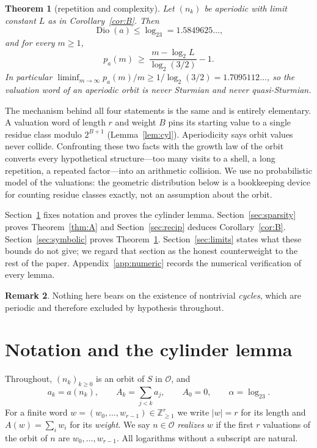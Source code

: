 \documentclass[11pt,reqno]{amsart}
\theoremstyle{plain}
\newtheorem{theorem}{Theorem}[section]
\theoremstyle{definition}
\newtheorem{remark}[theorem]{Remark}
\numberwithin{equation}{section}
\newcommand{\Z}{\mathbb{Z}}
\newcommand{\Odd}{\mathcal{O}}
\begin{document}
\begin{theorem}[repetition and complexity]
\label{thm:CD}
Let $(n_k)$ be aperiodic with limit constant $L$ as in
Corollary~\textup{\ref{cor:B}}.  Then
\[
\operatorname{Dio}(a)\le\log_23=1.5849625\ldots,
\]
and for every $m\ge1$,
\[
p_a(m)\ \ge\ \frac{m-\log_2L}{\log_2(3/2)}-1 .
\]
In particular $\liminf_{m\to\infty}p_a(m)/m\ge1/\log_2(3/2)=1.7095112\ldots$,
so the valuation word of an aperiodic orbit is never Sturmian and never
quasi-Sturmian.
\end{theorem}

The mechanism behind all four statements is the same and is entirely
elementary.  A valuation word of length $r$ and weight $B$ pins its starting
value to a single residue class modulo $2^{B+1}$ (Lemma~\ref{lem:cyl}).
Aperiodicity says orbit values never collide.  Confronting these two facts
with the growth law of the orbit converts every hypothetical structure---too
many visits to a shell, a long repetition, a repeated factor---into an
arithmetic collision.  We use no probabilistic model of the valuations: the
geometric distribution below is a bookkeeping device for counting residue
classes exactly, not an assumption about the orbit.

Section~\ref{sec:prelim} fixes notation and proves the cylinder lemma.
Section~\ref{sec:sparsity} proves Theorem~\ref{thm:A} and
Section~\ref{sec:recip} deduces Corollary~\ref{cor:B}.
Section~\ref{sec:symbolic} proves Theorem~\ref{thm:CD}.
Section~\ref{sec:limits} states what these bounds do not give; we regard that
section as the honest counterweight to the rest of the paper.
Appendix~\ref{app:numeric} records the numerical verification of every lemma.

\begin{remark}
Nothing here bears on the existence of nontrivial \emph{cycles}, which are
periodic and therefore excluded by hypothesis throughout.
\end{remark}

\section{Notation and the cylinder lemma}
\label{sec:prelim}

Throughout, $(n_k)_{k\ge0}$ is an orbit of $S$ in $\Odd$, and
\[
a_k=a(n_k),\qquad A_k=\sum_{j<k}a_j,\qquad A_0=0,\qquad
\alpha=\log_23 .
\]
For a finite word $w=(w_0,\dots,w_{r-1})\in\Z_{\ge1}^r$ we write
$|w|=r$ for its length and $A(w)=\sum_iw_i$ for its \emph{weight}.  We say
$n\in\Odd$ \emph{realizes} $w$ if the first $r$ valuations of the orbit of
$n$ are $w_0,\dots,w_{r-1}$.  All logarithms without a subscript are natural.
\end{document}

